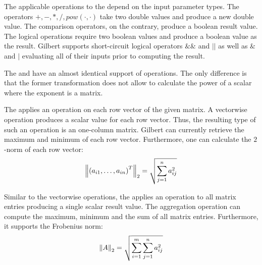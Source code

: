 The applicable operations to the  depend on the input parameter types.
The operators $+,-,*,/,pow(\cdot, \cdot)$ take two double values and produce a new double value.
The comparison operators, on the contrary, produce a boolean result value.
The logical operations require two boolean values and produce a boolean value as the result.
Gilbert supports short-circuit logical operators $\&\&$ and $||$ as well as $\&$ and $|$ evaluating all of their inputs prior to computing the result.

The  and  have an almost identical support of operations.
The only difference is that the former transformation does not allow to calculate the power of a scalar where the exponent is a matrix.

The  applies an operation on each row vector of the given matrix.
A vectorwise operation produces a scalar value for each row vector.
Thus, the resulting type of such an operation is an one-column matrix.
Gilbert can currently retrieve the maximum and minimum of each row vector.
Furthermore, one can calculate the $2$-norm of each row vector:
\begin{displaymath}
  \left\lVert\left(a_{i1}, \ldots, a_{in}\right)^T\right\rVert_2 = \sqrt{\sum_{j=1}^{n} a_{ij}^2}
\end{displaymath}

Similar to the vectorwise operations, the  applies an operation to all matrix entries producing a single scalar result value.
The aggregation operation can compute the maximum, minimum and the sum of all matrix entries.
Furthermore, it supports the Frobenius norm:
\begin{displaymath}
  \left\lVert A\right\rVert_2 = \sqrt{\sum_{i=1}^{m}\sum_{j=1}^{n} a_{ij}^2}
\end{displaymath}

